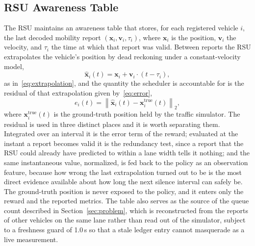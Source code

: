 \documentclass[journal]{IEEEtran}
\newcommand{\norm}[1]{\left\| #1 \right\|}
\begin{document}
\subsection{RSU Awareness Table}
The RSU maintains an awareness table that stores, for each registered vehicle $i$, the last decoded mobility report $(\mathbf{x}_i, \mathbf{v}_i, \tau_i)$, where $\mathbf{x}_i$ is the position, $\mathbf{v}_i$ the velocity, and $\tau_i$ the time at which that report was valid. Between reports the RSU extrapolates the vehicle's position by dead reckoning under a constant-velocity model,
\begin{equation}
    \hat{\mathbf{x}}_i(t) = \mathbf{x}_i + \mathbf{v}_i \cdot (t - \tau_i),
    \label{eq:extrapolation}
\end{equation}
as in~\eqref{eq:extrapolation}, and the quantity the scheduler is accountable for is the residual of that extrapolation given by~\eqref{eq:error},
\begin{equation}
    e_i(t) = \norm{ \hat{\mathbf{x}}_i(t) - \mathbf{x}_i^{\mathrm{true}}(t) }_2,
    \label{eq:error}
\end{equation}
where $\mathbf{x}_i^{\mathrm{true}}(t)$ is the ground-truth position held by the traffic simulator. The residual is used in three distinct places and it is worth separating them. Integrated over an interval it is the error term of the reward; evaluated at the instant a report becomes valid it is the redundancy test, since a report that the RSU could already have predicted to within a lane width tells it nothing; and the same instantaneous value, normalized, is fed back to the policy as an observation feature, because how wrong the last extrapolation turned out to be is the most direct evidence available about how long the next silence interval can safely be. The ground-truth position is never exposed to the policy, and it enters only the reward and the reported metrics. The table also serves as the source of the queue count described in Section~\ref{sec:problem}, which is reconstructed from the reports of other vehicles on the same lane rather than read out of the simulator, subject to a freshness guard of 1.0\,s so that a stale ledger entry cannot masquerade as a live measurement.
\end{document}
